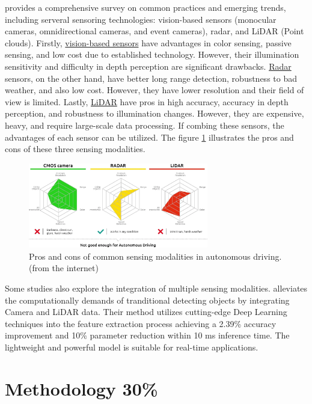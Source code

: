 \documentclass{article}
\begin{document}
\citet{yurtsever2020survey} provides a comprehensive survey on common practices and emerging trends, including serveral sensoring technologies: vision-based sensors (monocular cameras, omnidirectional cameras, and event cameras), radar, and LiDAR (Point clouds). Firstly, \underline{vision-based sensors} have advantages in color sensing, passive sensing, and low cost due to established technology. However, their illumination sensitivity and difficulty in depth perception are significant drawbacks. \underline{Radar} sensors, on the other hand, have better long range detection, robustness to bad weather, and also low cost. However, they have lower resolution and their field of view is limited. Lastly, \underline{LiDAR} have pros in high accuracy, accuracy in depth perception, and robustness to illumination changes. However, they are expensive, heavy, and require large-scale data processing. If combing these sensors, the advantages of each sensor can be utilized. The figure \ref{fig:sensing_modalities} illustrates the pros and cons of these three sensing modalities.

\begin{figure}[h]
  \centering
  \includegraphics[width=0.7\textwidth]{./pics/3_sensors.png}
  \caption{Pros and cons of common sensing modalities in autonomous driving. (from the internet)}
  \label{fig:sensing_modalities}
\end{figure}

Some studies also explore the integration of multiple sensing modalities. \citet{pederiva2025light} alleviates the computationally demands of tranditional detecting objects by integrating Camera and LiDAR data. Their method utilizes cutting-edge Deep Learning techniques into the feature extraction process achieving a 2.39\% accuracy improvement and 10\% parameter reduction within 10 ms inference time. The lightweight and powerful model is suitable for real-time applications.

\section{Methodology 30\%}\label{sec:methodology}
\end{document}
